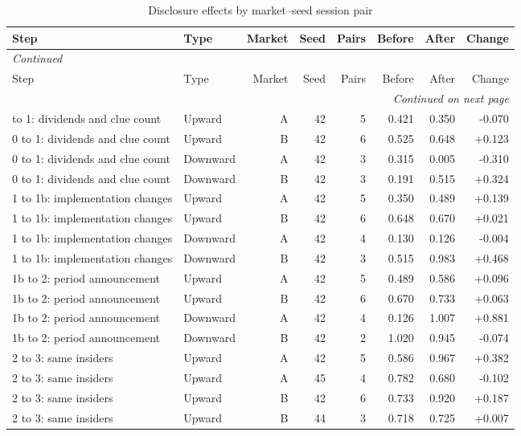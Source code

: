 \footnotesize
\begin{longtable}{p{3.3cm}lrrrrrr}
\caption{Disclosure effects by market--seed session pair}\label{tab:app-ladder-sessions}\\
\toprule
Step & Type & Market & Seed & Pairs & Before & After & Change \\
\midrule
\endfirsthead
\multicolumn{8}{l}{\textit{Continued}}\\
\toprule
Step & Type & Market & Seed & Pairs & Before & After & Change \\
\midrule
\endhead
\midrule
\multicolumn{8}{r}{\textit{Continued on next page}}\\
\endfoot
\bottomrule
\endlastfoot
0 to 1: dividends and clue count & Upward & A & 42 & 5 & 0.421 & 0.350 & -0.070 \\
0 to 1: dividends and clue count & Upward & B & 42 & 6 & 0.525 & 0.648 & +0.123 \\
0 to 1: dividends and clue count & Downward & A & 42 & 3 & 0.315 & 0.005 & -0.310 \\
0 to 1: dividends and clue count & Downward & B & 42 & 3 & 0.191 & 0.515 & +0.324 \\
1 to 1b: implementation changes & Upward & A & 42 & 5 & 0.350 & 0.489 & +0.139 \\
1 to 1b: implementation changes & Upward & B & 42 & 6 & 0.648 & 0.670 & +0.021 \\
1 to 1b: implementation changes & Downward & A & 42 & 4 & 0.130 & 0.126 & -0.004 \\
1 to 1b: implementation changes & Downward & B & 42 & 3 & 0.515 & 0.983 & +0.468 \\
1b to 2: period announcement & Upward & A & 42 & 5 & 0.489 & 0.586 & +0.096 \\
1b to 2: period announcement & Upward & B & 42 & 6 & 0.670 & 0.733 & +0.063 \\
1b to 2: period announcement & Downward & A & 42 & 4 & 0.126 & 1.007 & +0.881 \\
1b to 2: period announcement & Downward & B & 42 & 2 & 1.020 & 0.945 & -0.074 \\
2 to 3: same insiders & Upward & A & 42 & 5 & 0.586 & 0.967 & +0.382 \\
2 to 3: same insiders & Upward & A & 45 & 4 & 0.782 & 0.680 & -0.102 \\
2 to 3: same insiders & Upward & B & 42 & 6 & 0.733 & 0.920 & +0.187 \\
2 to 3: same insiders & Upward & B & 44 & 3 & 0.718 & 0.725 & +0.007 \\

\end{longtable}
